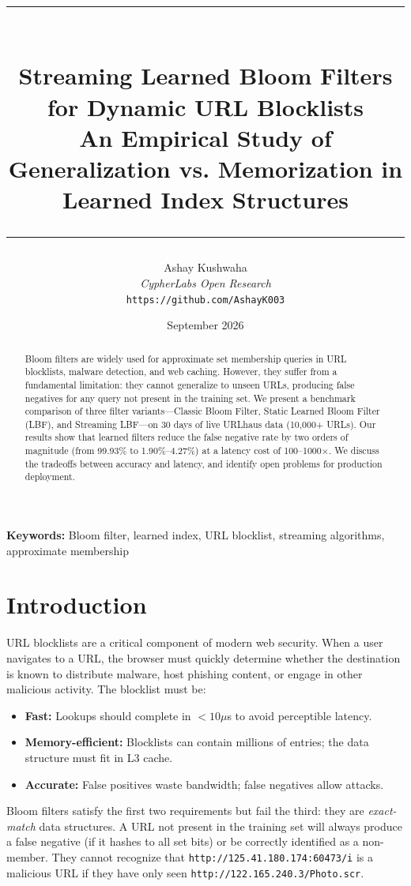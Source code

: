 \documentclass[11pt,a4paper]{article}
\title{
    \vspace{-2em}
    \rule{\textwidth}{1pt}\\[0.5em]
    \textbf{Streaming Learned Bloom Filters for Dynamic URL Blocklists}\\[0.3em]
    \large An Empirical Study of Generalization vs. Memorization in Learned Index Structures\\[0.5em]
    \rule{\textwidth}{1pt}
}
\author{
    Ashay Kushwaha\\
    \textit{CypherLabs Open Research}\\
    \texttt{https://github.com/AshayK003}
}
\date{September 2026}
\begin{document}
\maketitle

\begin{abstract}
Bloom filters are widely used for approximate set membership queries in URL blocklists, malware detection, and web caching. However, they suffer from a fundamental limitation: they cannot generalize to unseen URLs, producing false negatives for any query not present in the training set. We present a benchmark comparison of three filter variants---Classic Bloom Filter, Static Learned Bloom Filter (LBF), and Streaming LBF---on 30 days of live URLhaus data (10,000+ URLs). Our results show that learned filters reduce the false negative rate by two orders of magnitude (from 99.93\% to 1.90\%--4.27\%) at a latency cost of 100--1000$\times$. We discuss the tradeoffs between accuracy and latency, and identify open problems for production deployment.
\end{abstract}

\vspace{1em}
\noindent\textbf{Keywords:} Bloom filter, learned index, URL blocklist, streaming algorithms, approximate membership

\newpage
\tableofcontents
\newpage

\section{Introduction}

URL blocklists are a critical component of modern web security. When a user navigates to a URL, the browser must quickly determine whether the destination is known to distribute malware, host phishing content, or engage in other malicious activity. The blocklist must be:
\begin{itemize}
    \item \textbf{Fast:} Lookups should complete in $<10\mu$s to avoid perceptible latency.
    \item \textbf{Memory-efficient:} Blocklists can contain millions of entries; the data structure must fit in L3 cache.
    \item \textbf{Accurate:} False positives waste bandwidth; false negatives allow attacks.
\end{itemize}

Bloom filters \cite{bloom1970} satisfy the first two requirements but fail the third: they are \textit{exact-match} data structures. A URL not present in the training set will always produce a false negative (if it hashes to all set bits) or be correctly identified as a non-member. They cannot recognize that \texttt{http://125.41.180.174:60473/i} is a malicious URL if they have only seen \texttt{http://122.165.240.3/Photo.scr}.
\end{document}
